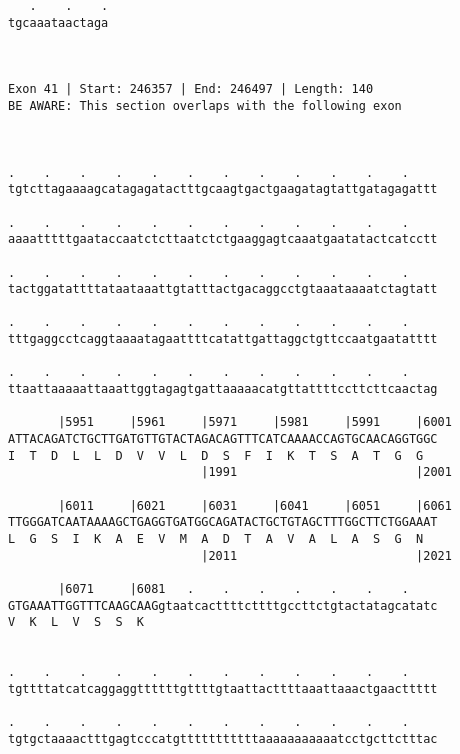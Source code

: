 \documentclass{article}
\begin{document}
\begin{Verbatim}
   .    .    .
tgcaaataactaga
              
              
 
Exon 41 | Start: 246357 | End: 246497 | Length: 140
BE AWARE: This section overlaps with the following exon



.    .    .    .    .    .    .    .    .    .    .    .    
tgtcttagaaaagcatagagatactttgcaagtgactgaagatagtattgatagagattt
                                                            
.    .    .    .    .    .    .    .    .    .    .    .    
aaaatttttgaataccaatctcttaatctctgaaggagtcaaatgaatatactcatcctt
                                                            
.    .    .    .    .    .    .    .    .    .    .    .    
tactggatattttataataaattgtatttactgacaggcctgtaaataaaatctagtatt
                                                            
.    .    .    .    .    .    .    .    .    .    .    .    
tttgaggcctcaggtaaaatagaattttcatattgattaggctgttccaatgaatatttt
                                                            
.    .    .    .    .    .    .    .    .    .    .    .    
ttaattaaaaattaaattggtagagtgattaaaaacatgttattttccttcttcaactag
                                                            
       |5951     |5961     |5971     |5981     |5991     |6001
ATTACAGATCTGCTTGATGTTGTACTAGACAGTTTCATCAAAACCAGTGCAACAGGTGGC
I  T  D  L  L  D  V  V  L  D  S  F  I  K  T  S  A  T  G  G  
                           |1991                         |2001
  
       |6011     |6021     |6031     |6041     |6051     |6061
TTGGGATCAATAAAAGCTGAGGTGATGGCAGATACTGCTGTAGCTTTGGCTTCTGGAAAT
L  G  S  I  K  A  E  V  M  A  D  T  A  V  A  L  A  S  G  N  
                           |2011                         |2021
  
       |6071     |6081   .    .    .    .    .    .    .    
GTGAAATTGGTTTCAAGCAAGgtaatcacttttcttttgccttctgtactatagcatatc
V  K  L  V  S  S  K                                         
                                                            
  
.    .    .    .    .    .    .    .    .    .    .    .    
tgttttatcatcaggaggttttttgttttgtaattacttttaaattaaactgaacttttt
                                                            
.    .    .    .    .    .    .    .    .    .    .    .    
tgtgctaaaactttgagtcccatgtttttttttttaaaaaaaaaaatcctgcttctttac
                                                            

\end{Verbatim}
\end{document}
